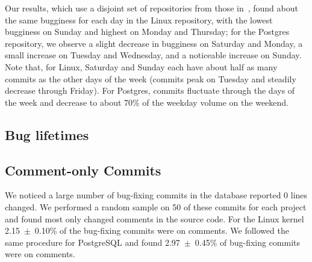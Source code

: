 Our results, which use a disjoint set of repositories from those
in~\cite{sliwerski-msr-2005}, found about the same bugginess for each
day in the Linux repository, with the lowest bugginess on Sunday and
highest on Monday and Thursday; for the Postgres repository, we
observe a slight decrease in bugginess on Saturday and Monday, a small
increase on Tuesday and Wednesday, and a noticeable increase on
Sunday.  Note that, for Linux, Saturday and Sunday each have about
half as many commits as the other days of the week (commits peak on
Tuesday and steadily decrease through Friday). For Postgres, commits
fluctuate through the days of the week and decrease to about 70\% of
the weekday volume on the weekend.



\subsection{Bug lifetimes}

\subsection{Comment-only Commits}
We noticed a large number of bug-fixing commits in the database
reported 0 lines changed. We performed a random sample on 50 of these
commits for each project and found most only changed comments in the
source code. For the Linux kernel 2.15~$\pm$~0.10\% of the bug-fixing
commits were on comments. We followed the same procedure for
PostgreSQL and found 2.97~$\pm$~0.45\% of bug-fixing commits were on
comments.

